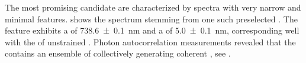 			The most promising candidate \nds are characterized by \fl spectra with very narrow \zpls and minimal \psb features.  shows the spectrum stemming from one such preselected \nd.
			The \ZPL feature exhibits a \cwl of \SI[separate-uncertainty = true]{738.6\pm0.1}{nm} and a \lw of \SI[separate-uncertainty = true]{5.0\pm0.1}{nm}, corresponding well with the \ZPL of unstrained \sivs. Photon autocorrelation measurements revealed that the \nd  contains an ensemble of \sivs collectively generating coherent \fl, see .

				\begin{figure}[!htb]
					\begin{subfigure}{ 0.49\linewidth}
						\centering
						\caption{}
						\label{subfig::spectrum_nd_multiple}
					\end{subfigure}
					\hfill
					\begin{subfigure}{ 0.49\linewidth}
						\centering

\end{subfigure}
\end{figure}

